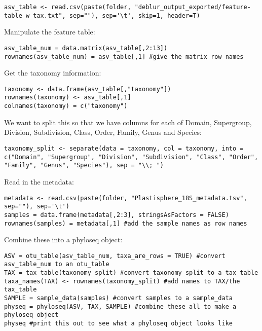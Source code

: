 \documentclass[
]{book}
\begin{document}
\begin{verbatim}
asv_table <- read.csv(paste(folder, "deblur_output_exported/feature-table_w_tax.txt", sep=""), sep='\t', skip=1, header=T)
\end{verbatim}

Manipulate the feature table:

\begin{verbatim}
asv_table_num = data.matrix(asv_table[,2:13]) 
rownames(asv_table_num) = asv_table[,1] #give the matrix row names
\end{verbatim}

Get the taxonomy information:

\begin{verbatim}
taxonomy <- data.frame(asv_table[,"taxonomy"])
rownames(taxonomy) <- asv_table[,1]
colnames(taxonomy) = c("taxonomy")
\end{verbatim}

We want to split this so that we have columns for each of Domain, Supergroup, Division, Subdivision, Class, Order, Family, Genus and Species:

\begin{verbatim}
taxonomy_split <- separate(data = taxonomy, col = taxonomy, into = c("Domain", "Supergroup", "Division", "Subdivision", "Class", "Order", "Family", "Genus", "Species"), sep = "\\; ")
\end{verbatim}

Read in the metadata:

\begin{verbatim}
metadata <- read.csv(paste(folder, "Plastisphere_18S_metadata.tsv", sep=""), sep='\t')
samples = data.frame(metadata[,2:3], stringsAsFactors = FALSE)
rownames(samples) = metadata[,1] #add the sample names as row names
\end{verbatim}

Combine these into a phyloseq object:

\begin{verbatim}
ASV = otu_table(asv_table_num, taxa_are_rows = TRUE) #convert asv_table_num to an otu_table
TAX = tax_table(taxonomy_split) #convert taxonomy_split to a tax_table
taxa_names(TAX) <- rownames(taxonomy_split) #add names to TAX/the tax_table
SAMPLE = sample_data(samples) #convert samples to a sample_data
physeq = phyloseq(ASV, TAX, SAMPLE) #combine these all to make a phyloseq object
physeq #print this out to see what a phyloseq object looks like
\end{verbatim}
\end{document}
